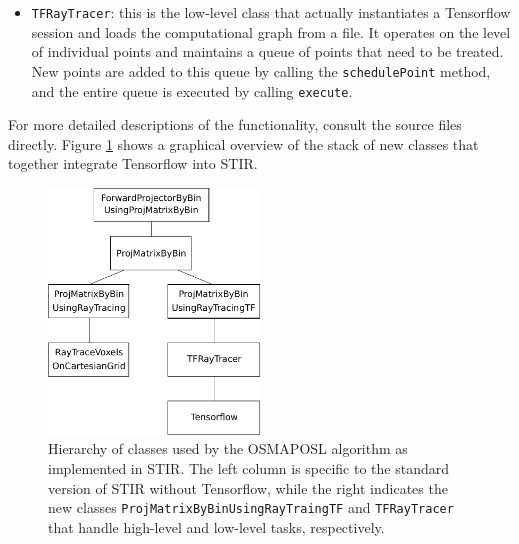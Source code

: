 \documentclass[a4paper, 11pt]{article}
\begin{document}
\begin{itemize}
    \item \texttt{TFRayTracer}: this is the low-level class that actually instantiates a Tensorflow session and loads the computational graph from a file. It operates on the level of individual points and maintains a queue of points that need to be treated. New points are added to this queue by calling the \texttt{schedulePoint} method, and the entire queue is executed by calling \texttt{execute}.
  \end{itemize}

  For more detailed descriptions of the functionality, consult the source files directly. Figure \ref{stir-class-structure} shows a graphical overview of the stack of new classes that together integrate Tensorflow into STIR.

  \begin{figure}
    \centering
    \includegraphics[width = 0.5\textwidth]{../ClassStructureSTIR.pdf}
    \caption{Hierarchy of classes used by the OSMAPOSL algorithm as implemented in STIR. The left column is specific to the standard version of STIR without Tensorflow, while the right indicates the new classes \texttt{ProjMatrixByBinUsingRayTraingTF} and \texttt{TFRayTracer} that handle high-level and low-level tasks, respectively.}
    \label{stir-class-structure}
  \end{figure}
\end{document}
